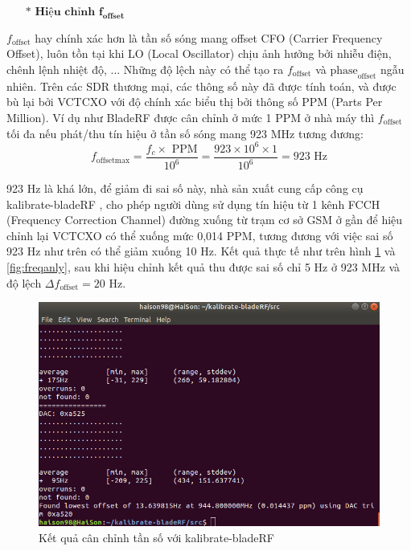\newpage

\begin{itemize}
	\item[$\ast$] \textbf{$\textbf{Hiệu chỉnh } \textbf{f}_{\textbf{offset}}$}
\end{itemize} 

$f_{\textrm{offset}}$ hay chính xác hơn là tần số sóng mang offset CFO (Carrier Frequency Offset), luôn tồn tại khi LO (Local Oscillator) chịu ảnh hưởng bởi nhiễu điện, chênh lệnh nhiệt độ, ... Những độ lệch này có thể tạo ra $f_{\textrm{offset}}$ và $\textrm{phase}_\textrm{offset}$ ngẫu nhiên. Trên các SDR thương mại, các thông số này đã được tính toán, và được bù lại bởi VCTCXO với độ chính xác biểu thị bởi thông số PPM (Parts Per Million). Ví dụ như BladeRF được cân chỉnh ở mức 1 PPM ở nhà máy thì $f_{\textrm{offset}}$ tối đa nếu phát/thu tín hiệu ở tần số sóng mang 923 MHz tương đương:
\begin{equation}
f_{\mathrm{offset  max}} = \frac{f_c \times\textrm{ PPM}}{10^6} = \frac{923\times 10^6 \times 1}{10^6} = 923 \textrm{ Hz}
\end{equation}

923 Hz là khá lớn, để giảm đi sai số này, nhà sản xuất cung cấp công cụ kalibrate-bladeRF \cite{kali}, cho phép người dùng sử dụng tín hiệu từ 1 kênh FCCH (Frequency Correction Channel) đường xuống từ trạm cơ sở GSM ở gần để hiệu chỉnh lại VCTCXO có thể xuống mức 0,014 PPM, tương đương với việc sai số 923 Hz như trên có thể giảm xuống 10 Hz. Kết quả thực tế như trên hình \ref{fig:freqcal} và \ref{fig:freqanly}, sau khi hiệu chỉnh kết quả thu được sai số chỉ 5 Hz ở 923 MHz và độ lệch $\Delta f_{\mathrm{offset}} = 20\textrm{ Hz}$.
\begin{figure} [!h]
	\centering
	\includegraphics[width=0.85\linewidth]{figures/freqcal.png}
	\caption{Kết quả cân chỉnh tần số với kalibrate-bladeRF}
	\label{fig:freqcal}
\end{figure}

